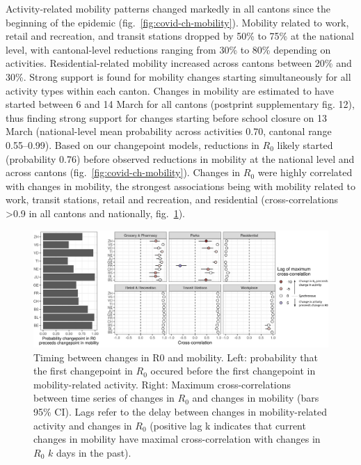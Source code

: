 Activity-related mobility patterns changed markedly in all cantons since the beginning of the epidemic (fig.~\ref{fig:covid-ch-mobility}). Mobility related to work, retail and recreation, and transit stations dropped by 50\% to 75\% at the national level, with cantonal-level reductions ranging from 30\% to 80\% depending on activities. Residential-related mobility increased across cantons between 20\% and 30\%. Strong support is found for mobility changes starting simultaneously for all activity types within each canton. Changes in mobility are estimated to have started between 6 and 14 March for all cantons (postprint supplementary fig. 12), thus finding strong support for changes starting before school closure on 13 March (national-level mean probability across activities 0.70, cantonal range 0.55–0.99). Based on our changepoint models, reductions in $R_0$ likely started (probability 0.76) before observed reductions in mobility at the national level and across cantons (fig.~\ref{fig:covid-ch-mobility}). Changes in $R_0$ were highly correlated with changes in mobility, the strongest associations being with mobility related to work, transit stations, retail and recreation, and residential (cross-correlations >0.9 in all cantons and nationally, fig.~\ref{fig:covid-ch-timing}). 
\begin{figure}\centering
  \includegraphics[width=\textwidth]{fig_covid-switzerland-npi/FIGURE_4.png}
  \caption[Timing between changes in $R_0$ and mobility.]{Timing between changes in R0 and mobility. Left: probability that the first changepoint in $R_0$ occured before the first changepoint in mobility-related activity. Right: Maximum cross-correlations between time series of changes in $R_0$ and changes in mobility (bars 95\% CI). Lags refer to the delay between changes in mobility-related activity and changes in $R_0$ (positive lag k indicates that current changes in mobility have maximal cross-correlation with changes in $R_0$ $k$ days in the past).}
  \label{fig:covid-ch-timing}
\end{figure}

